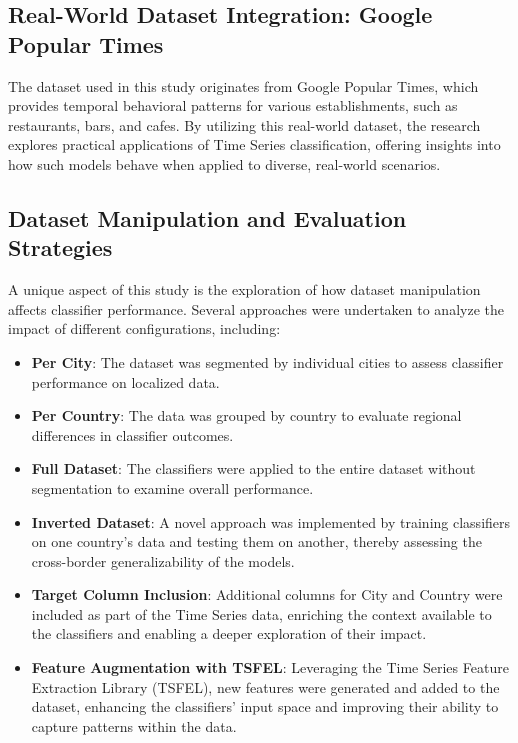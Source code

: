 \documentclass{ieeeaccess}
\begin{document}
\subsection{Real-World Dataset Integration: Google Popular Times}
The dataset used in this study originates from Google Popular Times, which provides temporal behavioral patterns for various establishments, such as restaurants, bars, and cafes. By utilizing this real-world dataset, the research explores practical applications of Time Series classification, offering insights into how such models behave when applied to diverse, real-world scenarios.

\subsection{Dataset Manipulation and Evaluation Strategies}
A unique aspect of this study is the exploration of how dataset manipulation affects classifier performance. Several approaches were undertaken to analyze the impact of different configurations, including:

\begin{itemize}
    \item \textbf{Per City}: The dataset was segmented by individual cities to assess classifier performance on localized data.
    \item \textbf{Per Country}: The data was grouped by country to evaluate regional differences in classifier outcomes.
    \item \textbf{Full Dataset}: The classifiers were applied to the entire dataset without segmentation to examine overall performance.
    \item \textbf{Inverted Dataset}: A novel approach was implemented by training classifiers on one country’s data and testing them on another, thereby assessing the cross-border generalizability of the models.
    \item \textbf{Target Column Inclusion}: Additional columns for City and Country were included as part of the Time Series data, enriching the context available to the classifiers and enabling a deeper exploration of their impact.
    \item \textbf{Feature Augmentation with TSFEL}: Leveraging the Time Series Feature Extraction Library (TSFEL), new features were generated and added to the dataset, enhancing the classifiers’ input space and improving their ability to capture patterns within the data.
\end{itemize}
\end{document}
